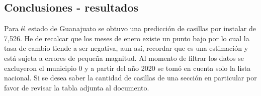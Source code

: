 \documentclass[12pt,a4paper]{report}
\begin{document}
\begin{center}
\section*{Conclusiones - resultados}
\end{center}

Para él estado de Guanajuato se obtuvo una predicción de casillas por instalar de 7,526. He de recalcar que los meses de enero existe un punto bajo por lo cual la tasa de cambio tiende a ser negativa, aun así, recordar que es una estimación y está sujeta a errores de pequeña magnitud. Al momento de filtrar los datos se excluyeron el municipio 0 y a partir del año 2020 se tomó en cuenta solo la lista nacional. Si se desea saber la cantidad de casillas de una sección en particular por favor de revisar la tabla adjunta al documento.

\printbibliography
\end{document}
